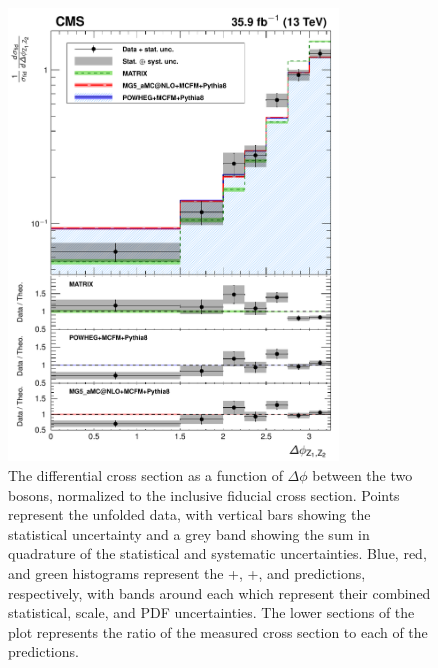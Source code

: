 \begin{figure}[htbp]
  \begin{center}
    \includegraphics[width=0.78\textwidth]{results/unfold_deltaPhiZZ.pdf}
    \caption[Normalized differential {\ZZ} cross section as a function of $\Delta \phi$ between the {\PZ} bosons]{
        The {\ZZ} differential cross section as a function of $\Delta \phi$ between the two {\PZ} bosons, normalized to the inclusive fiducial cross section.
        Points represent the unfolded data, with vertical bars showing the statistical uncertainty and a grey band showing the sum in quadrature of the statistical and systematic uncertainties.
        Blue, red, and green histograms represent the {\POWHEG}+{\MCFM}, {\MGAMC}+{\MCFM}, and {\MATRIX} predictions, respectively, with bands around each which represent their combined statistical, scale, and PDF uncertainties.
        The lower sections of the plot represents the ratio of the measured cross section to each of the predictions.
      }\label{fig:unfold_deltaPhiZZ}
  \end{center}
\end{figure}

